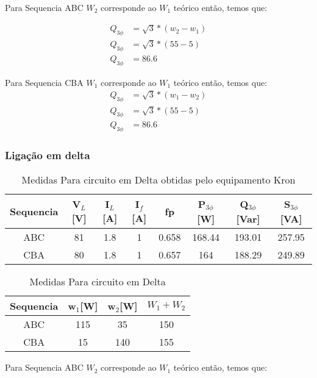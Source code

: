 \documentclass[a4paper, 12pt]{article}
\begin{document}
    Para Sequencia ABC $W_2$ corresponde ao $W_1$ teórico então, temos que:

    \[\begin{split}
        Q_{3\phi} & = \sqrt{3}\ast(w_2 - w_1) \\
        Q_{3\phi} & = \sqrt{3}\ast(55 - 5 ) \\
        Q_{3\phi} & = 86.6
        \end{split}
    \]

    Para Sequencia CBA $W_1$ corresponde ao $W_1$ teórico então, temos que:
       \[\begin{split}
        Q_{3\phi} & = \sqrt{3}\ast(w_1 - w_2) \\
        Q_{3\phi} & = \sqrt{3}\ast(55 - 5 ) \\
        Q_{3\phi} & = 86.6
        \end{split}
    \]

        \subsubsection{Ligação em delta}
        \justifying
    \begin{table}[H]
         \centering
        \begin{tabular}{|c|c|c|c|c|c|c|c|}
              \hline %
                  Sequencia & V$_L$[V] & I$_L$[A] & I$_f$[A] & fp & P$_{3\phi}$[W] & Q$_{3\phi}$[Var] & S$_{3\phi}$[VA] \\
              \hline %
           ABC & 81 & 1.8 & 1 & 0.658 & 168.44 & 193.01 & 257.95     \\
              \hline %
           CBA & 80 & 1.8 & 1 & 0.657 & 164 & 188.29 & 249.89     \\
              \hline %
        \end{tabular}
        \caption{Medidas Para circuito em Delta obtidas pelo equipamento Kron}
    \end{table}

    \begin{table}[H]
         \centering
        \begin{tabular}{|c|c|c|c|}
              \hline %
                  Sequencia & w$_1$[W] & w$_2$[W] & $W_1 + W_2$ \\
              \hline %
           ABC & 115 & 35 & 150     \\
              \hline %
           CBA & 15 & 140 & 155     \\
              \hline %
        \end{tabular}
        \caption{Medidas Para circuito em Delta}
    \end{table}
 Para Sequencia ABC $W_2$ corresponde ao $W_1$ teórico então, temos que:
\end{document}
